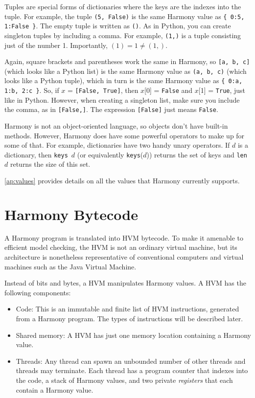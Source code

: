 \documentclass{report}
\begin{document}
Tuples are special forms of dictionaries where the keys are
the indexes into the tuple.  For example, the tuple
\texttt{(5, False)} is the same Harmony value as
\texttt{\{ 0:5, 1:False \}}.
The empty tuple is written as \texttt{()}.
As in Python, you can create singleton tuples by including a comma.
For example, \texttt{(1,)} is a tuple consisting just of the number 1.
Importantly, $(1) = 1 \ne (1,)$.

Again, square brackets and parentheses work the same in Harmony, so
\texttt{[a, b, c]} (which looks like a Python list)
is the same Harmony value as \texttt{(a, b, c)} (which looks like a Python tuple),
which in turn is the same Harmony value as \texttt{\{ 0:a, 1:b, 2:c \}}.
So, if $x$ = \texttt{[False, True]},
then $x$[0] = \texttt{False} and $x$[1] = \texttt{True}, just like in Python.
However, when creating a singleton list, make sure you include the
comma, as in \texttt{[False,]}.  The expression \texttt{[False]} just means
\texttt{False}.

Harmony is not an object-oriented language, so objects don't have
built-in methods.  However, Harmony does have some powerful operators to
make up for some of that.
For example, dictionaries have two handy unary operators.
If $d$ is a
dictionary, then \texttt{keys}~$d$ (or equivalently \texttt{keys}($d$))
returns the set of keys and \texttt{len}~$d$ returns the size of
this set.

\autoref{ap:values} provides details on all the values that
Harmony currently supports.

\section*{Harmony Bytecode}

A Harmony program is translated into HVM bytecode.
To make it amenable to efficient model checking,
the HVM is not an ordinary virtual machine, but its architecture
is nonetheless representative of conventional computers and
virtual machines such as the Java Virtual Machine.

Instead of bits and bytes, a HVM manipulates Harmony values.
A HVM has the following components:
\begin{itemize}
\item Code:  This is an immutable and finite list of HVM instructions,
generated from a Harmony program.  The types of instructions will be described later.
\item Shared memory: A HVM has just one memory location containing
a Harmony value.
\item Threads:  Any thread
can spawn an unbounded number of other threads and threads may terminate.
Each thread has a program counter that indexes into the code,
%
a stack of Harmony values,
and two private \emph{registers} that each contain a Harmony value.
%
\end{itemize}
\end{document}
